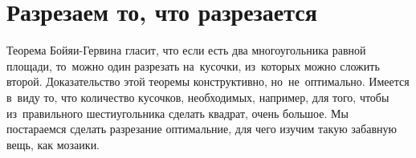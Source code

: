 
\section*{Разрезаем то, что разрезается}



Теорема Бойяи-Гервина гласит, что если есть два многоугольника равной площади,
то~можно один разрезать на~кусочки, из~которых можно сложить второй.
Доказательство этой теоремы конструктивно, но~не~оптимально.
Имеется в~виду то, что количество кусочков, необходимых, например, для того,
чтобы из~правильного шестиугольника сделать квадрат, очень большое.
Мы постараемся сделать разрезание оптимальние, для чего изучим такую забавную
вещь, как мозаики.

